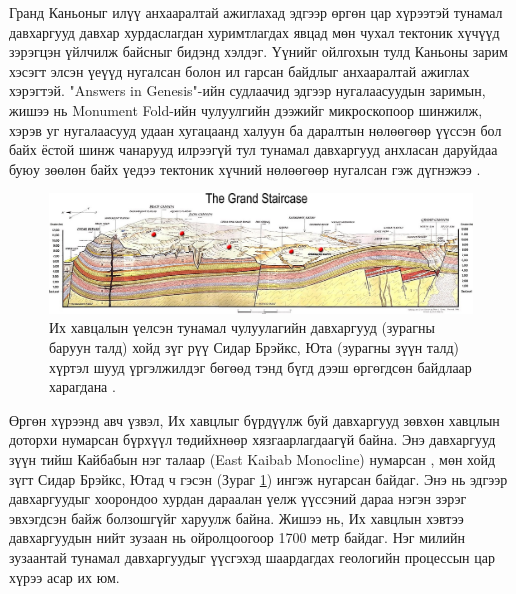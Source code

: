 \documentclass[10pt,twocolumn,letterpaper]{article}
\begin{document}
Гранд Каньоныг илүү анхааралтай ажиглахад эдгээр өргөн цар хүрээтэй тунамал давхаргууд давхар хурдаслагдан хуримтлагдах явцад мөн чухал тектоник хүчүүд зэрэгцэн үйлчилж байсныг бидэнд хэлдэг. Үүнийг ойлгохын тулд Каньоны зарим хэсэгт элсэн үеүүд нугалсан болон ил гарсан байдлыг анхааралтай ажиглах хэрэгтэй. "Answers in Genesis"-ийн судлаачид \cite{42} эдгээр нугалаасуудын заримын, жишээ нь Monument Fold-ийн чулуулгийн дээжийг микроскопоор шинжилж, хэрэв уг нугалаасууд удаан хугацаанд халуун ба даралтын нөлөөгөөр үүссэн бол байх ёстой шинж чанарууд илрээгүй тул тунамал давхаргууд анхласан даруйдаа буюу зөөлөн байх үедээ тектоник хүчний нөлөөгөөр нугалсан гэж дүгнэжээ \cite{43}.

\begin{figure}
\begin{center}

\includegraphics[width=1\textwidth]{Grand_Staircase-big.jpg}
\end{center}
   \caption{Их хавцалын үелсэн тунамал чулуулагийн давхаргууд (зурагны баруун талд) хойд зүг рүү Сидар Брэйкс, Юта (зурагны зүүн талд) хүртэл шууд үргэлжилдэг бөгөөд тэнд бүгд дээш өргөгдсөн байдлаар харагдана \cite{50}.}
\label{fig:4}
\end{figure}

Өргөн хүрээнд авч үзвэл, Их хавцлыг бүрдүүлж буй давхаргууд зөвхөн хавцлын доторхи нумарсан бүрхүүл төдийхнөөр хязгаарлагдаагүй байна. Энэ давхаргууд зүүн тийш Кайбабын нэг талаар (East Kaibab Monocline) нумарсан \cite{46}, мөн хойд зүгт Сидар Брэйкс, Ютад ч гэсэн (Зураг \ref{fig:4}) ингэж нугарсан байдаг. Энэ нь эдгээр давхаргуудыг хоорондоо хурдан дараалан үелж үүссэний дараа нэгэн зэрэг эвхэгдсэн байж болзошгүйг харуулж байна. Жишээ нь, Их хавцлын хэвтээ давхаргуудын нийт зузаан нь ойролцоогоор 1700 метр байдаг. Нэг милийн зузаантай тунамал давхаргуудыг үүсгэхэд шаардагдах геологийн процессын цар хүрээ асар их юм.
\end{document}
